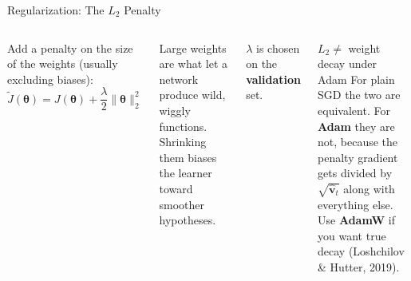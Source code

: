 \documentclass[aspectratio=169,11pt]{beamer}
\newcommand{\emphc}[1]{\textcolor{harvardcrimson}{#1}}
\begin{document}
\begin{frame}{Regularization: The $L_2$ Penalty}
\begin{columns}[T]
Add a penalty on the size of the weights (usually excluding biases):
\[
    \tilde{J}(\bm{\theta}) = J(\bm{\theta}) + \frac{\lambda}{2}\|\bm{\theta}\|_2^2
\]

\vspace{0.2cm}
Large weights are what let a network produce wild, wiggly functions.  Shrinking them biases the learner toward \emphc{smoother} hypotheses.

\vspace{0.2cm}
$\lambda$ is chosen on the \textbf{validation} set.

\begin{alertblock}{$L_2 \neq$ weight decay under Adam}
\small For plain SGD the two are equivalent.  For \textbf{Adam} they are not, because the penalty gradient gets divided by $\sqrt{\hat{\bm{v}}_t}$ along with everything else.
\\[4pt]
Use \textbf{AdamW} if you want true decay (Loshchilov \& Hutter, 2019).
\end{alertblock}
\end{columns}
\end{frame}
\end{document}
